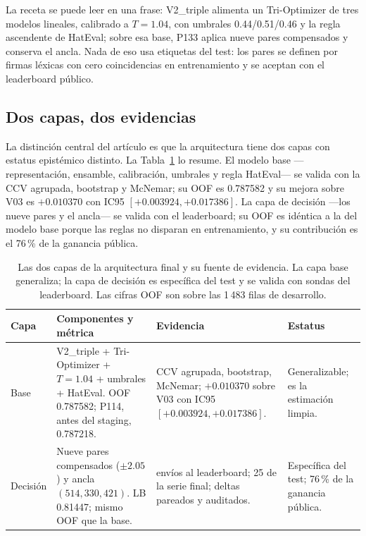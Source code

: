 La receta se puede leer en una frase: V2\_triple alimenta un Tri-Optimizer de
tres modelos lineales, calibrado a $T=1.04$, con umbrales 0.44/0.51/0.46 y la
regla ascendente de HatEval; sobre esa base, P133 aplica nueve pares
compensados y conserva el ancla. Nada de eso usa etiquetas del test: los pares
se definen por firmas léxicas con cero coincidencias en entrenamiento y se
aceptan con el leaderboard público.

\subsection{Dos capas, dos evidencias}

La distinción central del artículo es que la arquitectura tiene dos capas con
estatus epistémico distinto. La Tabla~\ref{tab:capas} lo resume. El modelo base
---representación, ensamble, calibración, umbrales y regla HatEval--- se valida
con la CCV agrupada, bootstrap y McNemar; su OOF es 0.787582 y su mejora sobre
V03 es $+0.010370$ con IC95 $[+0.003924,+0.017386]$. La capa de decisión ---los
nueve pares y el ancla--- se valida con el leaderboard; su OOF es idéntica a la
del modelo base porque las reglas no disparan en entrenamiento, y su
contribución es el 76\,\% de la ganancia pública.

\begin{table}[t]
\centering
\caption{Las dos capas de la arquitectura final y su fuente de evidencia. La
capa base generaliza; la capa de decisión es específica del test y se valida
con sondas del leaderboard. Las cifras OOF son sobre las 1\,483 filas de
desarrollo.}
\label{tab:capas}
\scriptsize
\begin{tabularx}{\textwidth}{@{}>{\raggedright\arraybackslash}p{2.2cm}>{\raggedright\arraybackslash}X>{\raggedright\arraybackslash}p{3.3cm}>{\raggedright\arraybackslash}p{2.7cm}@{}}
\toprule
Capa & Componentes y métrica & Evidencia & Estatus \\
\midrule
Base & V2\_triple + Tri-Optimizer + $T=1.04$ + umbrales + HatEval. OOF 0.787582; P114, antes del staging, 0.787218. & CCV agrupada, bootstrap, McNemar; $+0.010370$ sobre V03 con IC95 $[+0.003924,+0.017386]$. & Generalizable; es la estimación limpia. \\
Decisión & Nueve pares compensados ($\pm2.05$) y ancla $(514,330,421)$. LB 0.81447; mismo OOF que la base. & 47 envíos al leaderboard; 25 de la serie final; deltas pareados y auditados. & Específica del test; 76\,\% de la ganancia pública. \\
\bottomrule
\end{tabularx}
\end{table}

